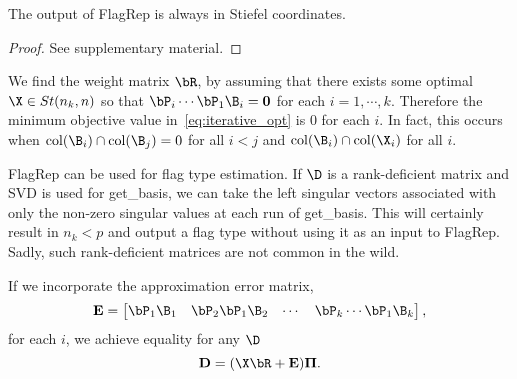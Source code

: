 \begin{prop}\label{prop:stiefelcoords}
    The output of FlagRep is always in Stiefel coordinates.
\end{prop}
\begin{proof}
    See supplementary material.
\end{proof}






\begin{remark}
    We find the weight matrix $\bR$, by assuming that there exists some optimal $\X \in St(n_k,n)$ so that $\bP_{i} \cdots \bP_1 \B_i=\mathbf{0}$ for each $i=1, \cdots, k$. Therefore the minimum objective value in~\cref{eq:iterative_opt} is $0$ for each $i$. In fact, this occurs when $\mathrm{col}(\B_i) \cap \mathrm{col}(\B_j) = 0$ for all $i<j$ and $\mathrm{col}(\B_i) \cap \mathrm{col}(\X_i)$ for all $i$.
\end{remark}




\begin{remark}
    FlagRep can be used for flag type estimation. If $\D$ is a rank-deficient matrix and SVD is used for get\_basis, we can take the left singular vectors associated with only the non-zero singular values at each run of get\_basis. This will certainly result in $n_k < p$ and output a flag type without using it as an input to FlagRep. Sadly, such rank-deficient matrices are not common in the wild.
\end{remark}

\begin{remark}
If we incorporate the approximation error matrix, 
\begin{equation}
    \mathbf{E} = \begin{bmatrix}
        \bP_1\B_1 & \bP_2 \bP_1 \B_2 & \cdots & \bP_k\cdots\bP_1\B_k  
    \end{bmatrix},
\end{equation}
for each $i$, we achieve equality for any $\D$
\begin{equation}
    \mathbf{D} = (\X \bR + \mathbf{E})\boldsymbol{\Pi} .
\end{equation}
\end{remark}

